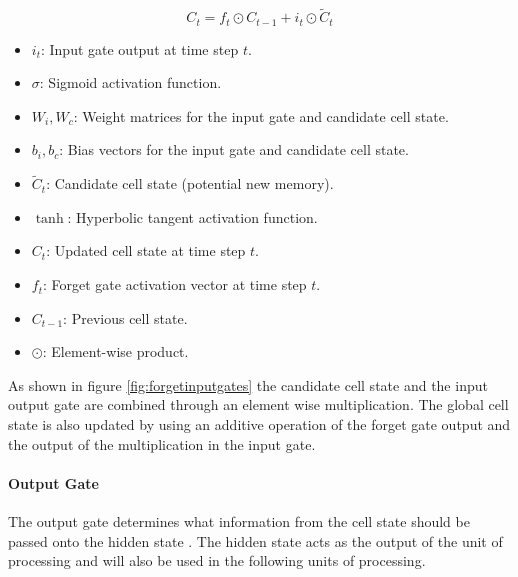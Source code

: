 \[
C_t = f_t \odot C_{t-1} + i_t \odot \tilde{C}_t
\tag{27}
\label{eqn:cellupdate}
\]
{\small
\begin{itemize}
	\item $i_t$: Input gate output at time step $t$.
	\item $\sigma$: Sigmoid activation function.
	\item $W_i, W_c$: Weight matrices for the input gate and candidate cell state.

	\item $b_i, b_c$: Bias vectors for the input gate and candidate cell state.
	\item $\tilde{C}_t$: Candidate cell state (potential new memory).
	\item $\tanh$: Hyperbolic tangent activation function.
	\item $C_t$: Updated cell state at time step $t$.
	\item $f_t$: Forget gate activation vector at time step $t$.
	\item $C_{t-1}$: Previous cell state.
	\item $\odot$: Element-wise product.
\end{itemize}
}
As shown in figure \ref{fig:forgetinputgates} the candidate cell state and the input output gate are combined through an element wise multiplication. The global cell state is also updated by using an additive operation of the forget gate output and the output of the multiplication in the input gate.
 \paragraph{Output Gate}
The output gate determines what information from the cell state should be passed onto the hidden state \cite{zhu2025novel}. The hidden state acts as the output of the unit of processing and will also be used in the following units of processing.
 
